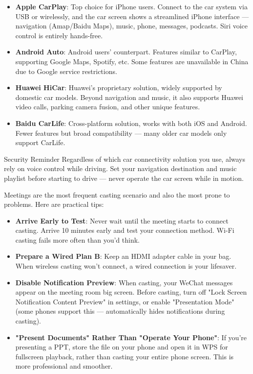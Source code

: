 \begin{itemize}
  \item \textbf{Apple CarPlay}: Top choice for iPhone users. Connect to the car system via USB or wirelessly, and the car screen shows a streamlined iPhone interface — navigation (Amap/Baidu Maps), music, phone, messages, podcasts. Siri voice control is entirely hands-free.
  \item \textbf{Android Auto}: Android users' counterpart. Features similar to CarPlay, supporting Google Maps, Spotify, etc. Some features are unavailable in China due to Google service restrictions.
  \item \textbf{Huawei HiCar}: Huawei's proprietary solution, widely supported by domestic car models. Beyond navigation and music, it also supports Huawei video calls, parking camera fusion, and other unique features.
  \item \textbf{Baidu CarLife}: Cross-platform solution, works with both iOS and Android. Fewer features but broad compatibility — many older car models only support CarLife.
\end{itemize}

\begin{tcbwarn}{Security Reminder}
Regardless of which car connectivity solution you use, always rely on voice control while driving. Set your navigation destination and music playlist before starting to drive — never operate the car screen while in motion.

\end{tcbwarn}


Meetings are the most frequent casting scenario and also the most prone to problems. Here are practical tips:

\begin{itemize}
  \item \textbf{Arrive Early to Test}: Never wait until the meeting starts to connect casting. Arrive 10 minutes early and test your connection method. Wi-Fi casting fails more often than you'd think.
  \item \textbf{Prepare a Wired Plan B}: Keep an HDMI adapter cable in your bag. When wireless casting won't connect, a wired connection is your lifesaver.
  \item \textbf{Disable Notification Preview}: When casting, your WeChat messages appear on the meeting room big screen. Before casting, turn off "Lock Screen Notification Content Preview" in settings, or enable "Presentation Mode" (some phones support this — automatically hides notifications during casting).
  \item \textbf{"Present Documents" Rather Than "Operate Your Phone"}: If you're presenting a PPT, store the file on your phone and open it in WPS for fullscreen playback, rather than casting your entire phone screen. This is more professional and smoother.
\end{itemize}

